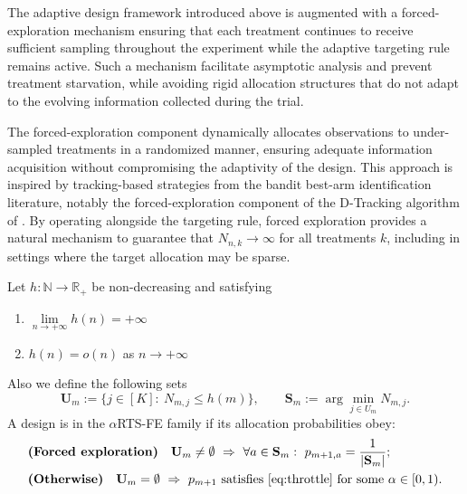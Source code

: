 
The adaptive design framework introduced above is augmented with a forced-exploration mechanism ensuring that each treatment continues to receive sufficient sampling throughout the experiment while the adaptive targeting rule remains active. Such a mechanism facilitate asymptotic analysis and prevent treatment starvation, while avoiding rigid allocation structures that do not adapt to the evolving information collected during the trial.

The forced-exploration component dynamically allocates observations to under-sampled
treatments in a randomized manner, ensuring adequate information acquisition without
compromising the adaptivity of the design. This approach is inspired by tracking-based
strategies from the bandit best-arm identification literature, notably the forced-exploration
component of the D-Tracking algorithm of \cite{garivier2016optimal}. By operating
alongside the targeting rule, forced exploration provides a natural mechanism to
guarantee that $N_{n,k}\to\infty$ for all treatments $k$, including in settings where
the target allocation may be sparse.
 
\begin{definition}\label{def:rts-fe-def}
	
	{\color{revisiongreen} Let $h:\mathbb{N}\to\mathbb{R}_+$ be non-decreasing and satisfying
		\begin{enumerate}[label=(\roman*)]
			\item $\lim\limits_{n \to +\infty} h(n) = +\infty$
			\item $h(n) = o(n)$ as \(n \to +\infty\)
		\end{enumerate}
	}
	Also we define the following sets
	\begin{equation}
		\mathbf{U}_m:=\{j\in[K]:\ N_{m,j}\le h(m)\},\qquad \mathbf{S}_m:=\arg\min_{j\in U_m} N_{m,j}.
	\end{equation}
	A design is in the \(\alpha\)RTS-FE family if its allocation probabilities obey:
	\begin{align}
		&\textbf{(Forced exploration)}\quad \mathbf{U}_m\neq\emptyset\ \Rightarrow\ \forall a\in \mathbf{S}_m:\ p_{m+1,a}=\frac{1}{|\mathbf{S}_m|};\label{eq:fe-phase}\\
		&\textbf{(Otherwise)}\quad \mathbf{U}_m=\emptyset\ \Rightarrow\ \text{$p_{m+1}$ satisfies \eqref{eq:throttle} for some $\alpha\in[0,1)$}.\label{eq:fe-otherwise}
	\end{align}
\end{definition}

